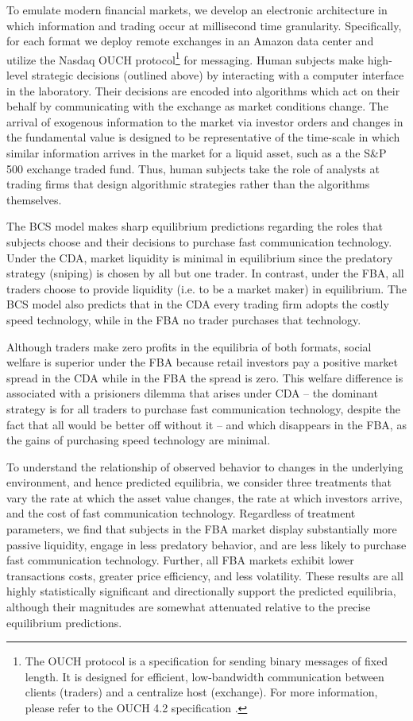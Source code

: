 \documentclass[12pt]{article}
\begin{document}
To emulate modern financial markets, we develop an electronic architecture in which information and trading occur at millisecond time granularity. Specifically, for each format we deploy remote exchanges in an Amazon data center and utilize the Nasdaq OUCH protocol\footnote{The OUCH protocol is a specification for sending binary messages of fixed length. It is designed for efficient, low-bandwidth communication between clients (traders) and a centralize host (exchange). For more information, please refer to the OUCH 4.2 specification \citep{Nasdaq2018}.} for messaging. Human subjects make high-level strategic decisions (outlined above) by interacting with a computer interface in the laboratory. Their decisions are encoded into algorithms which act on their behalf by communicating with the exchange as market conditions change. The arrival of exogenous information to the market via investor orders and changes in the fundamental value is designed to be representative of the time-scale in which similar information arrives in the market for a liquid asset, such as a the S\&P 500 exchange traded fund. Thus, human subjects take the role of analysts at trading firms that design algorithmic strategies rather than the algorithms themselves.

The BCS model makes sharp equilibrium predictions regarding the roles that subjects choose and their decisions to purchase fast communication technology. Under the CDA, market liquidity  is minimal in equilibrium since the predatory strategy (sniping) is chosen by all but one trader. In contrast, under the FBA, all traders choose to provide liquidity (i.e. to be a market maker) in equilibrium. The BCS model also predicts that in the CDA every trading firm adopts the costly speed technology, while in the FBA no trader purchases that technology. 

Although traders make zero profits in the equilibria of both formats, social welfare is superior under the FBA because retail investors pay a positive market spread in the CDA while in the FBA the spread is zero. This welfare difference is associated with a prisioners dilemma that arises under CDA -- the dominant strategy is for all traders to purchase fast communication technology, despite the fact that all would be better off without it -- and which disappears in the FBA, as the gains of purchasing speed technology are minimal. 

To understand the relationship of observed behavior to changes in the underlying environment, and hence predicted equilibria, we consider three treatments that vary the rate at which the asset value changes, the rate at which investors arrive, and the cost of fast communication technology. Regardless of treatment parameters, we find that subjects in the FBA market display substantially more passive liquidity, engage in less predatory behavior, and are less likely to purchase fast communication technology. Further, all FBA markets exhibit lower transactions costs, greater price efficiency, and less volatility. These results are all highly statistically significant and directionally support the predicted equilibria, although their magnitudes are somewhat attenuated relative to the precise equilibrium predictions.
\end{document}
